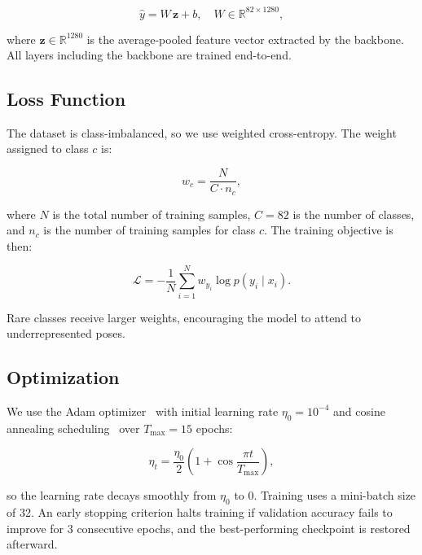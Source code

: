 \documentclass[conference]{IEEEtran}
\begin{document}
\begin{equation}
\hat{y} = W\,\mathbf{z} + b, \quad W \in \mathbb{R}^{82 \times 1280},
\label{eq:classifier}
\end{equation}

where $\mathbf{z} \in \mathbb{R}^{1280}$ is the average-pooled feature vector extracted by the backbone. All layers including the backbone are trained end-to-end.

\subsection{Loss Function}

The dataset is class-imbalanced, so we use weighted cross-entropy. The weight assigned to class $c$ is:

\begin{equation}
w_c = \frac{N}{C \cdot n_c},
\label{eq:classweight}
\end{equation}

where $N$ is the total number of training samples, $C = 82$ is the number of classes, and $n_c$ is the number of training samples for class $c$. The training objective is then:

\begin{equation}
\mathcal{L} = -\frac{1}{N} \sum_{i=1}^{N} w_{y_i} \log p\!\left(y_i \mid x_i\right).
\label{eq:loss}
\end{equation}

Rare classes receive larger weights, encouraging the model to attend to underrepresented poses.

\subsection{Optimization}

We use the Adam optimizer~\cite{kingma2015adam} with initial learning rate $\eta_0 = 10^{-4}$ and cosine annealing scheduling~\cite{loshchilov2017sgdr} over $T_{\max} = 15$ epochs:

\begin{equation}
\eta_t = \frac{\eta_0}{2}\!\left(1 + \cos\!\frac{\pi t}{T_{\max}}\right),
\label{eq:cosine}
\end{equation}

so the learning rate decays smoothly from $\eta_0$ to $0$. Training uses a mini-batch size of 32. An early stopping criterion halts training if validation accuracy fails to improve for 3 consecutive epochs, and the best-performing checkpoint is restored afterward.
\end{document}
